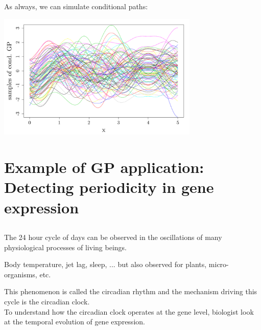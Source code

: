 \documentclass{beamer}
\begin{document}
\begin{frame}{}
As always, we can simulate conditional paths:
	\begin{center}
	\includegraphics[height=6cm]{figures/R/exotic_simul}
	\end{center}
\end{frame}

\section[Application]{Example of GP application: Detecting periodicity in gene expression}
\subsection{}

\begin{frame}{}
The 24 hour cycle of days can be observed in the oscillations of many physiological processes of living beings.\\
\begin{examples}
 Body temperature, jet lag, sleep, ... but also observed for plants, micro-organisms, etc.
\end{examples}
\vspace{0.5cm}
This phenomenon is called the \alert{circadian rhythm} and the mechanism driving this cycle is the \alert{circadian clock}. \\
\vspace{0.5cm}
To understand how the circadian clock operates at the gene level, biologist look at the temporal evolution of gene expression. 
\end{frame}
\end{document}
